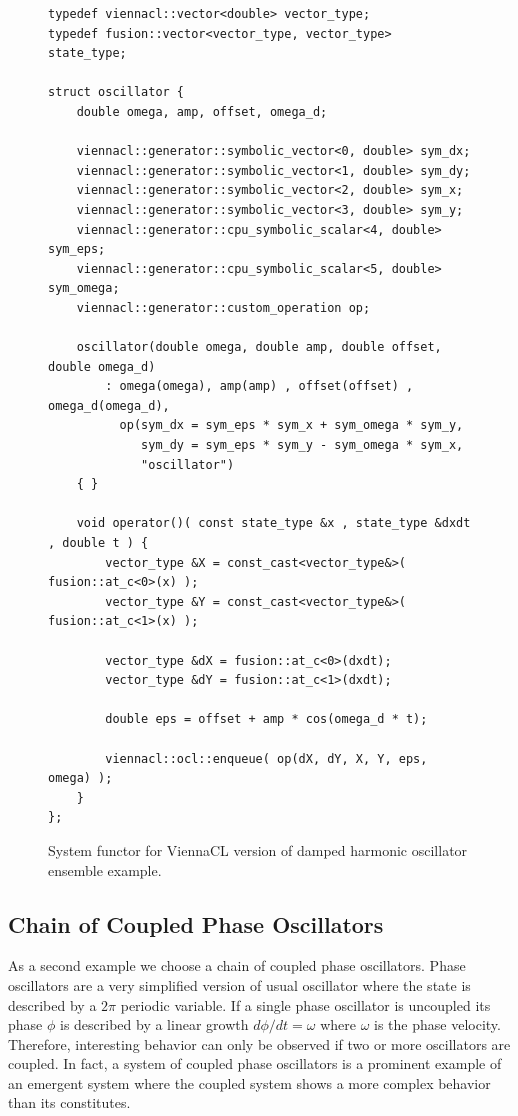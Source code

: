 \documentclass[1p]{elsarticle}
\begin{document}
\begin{figure}[p]
\begin{lstlisting}
typedef viennacl::vector<double> vector_type;
typedef fusion::vector<vector_type, vector_type> state_type;

struct oscillator {
    double omega, amp, offset, omega_d;

    viennacl::generator::symbolic_vector<0, double> sym_dx;
    viennacl::generator::symbolic_vector<1, double> sym_dy;
    viennacl::generator::symbolic_vector<2, double> sym_x;
    viennacl::generator::symbolic_vector<3, double> sym_y;
    viennacl::generator::cpu_symbolic_scalar<4, double> sym_eps;
    viennacl::generator::cpu_symbolic_scalar<5, double> sym_omega;
    viennacl::generator::custom_operation op;

    oscillator(double omega, double amp, double offset, double omega_d)
        : omega(omega), amp(amp) , offset(offset) , omega_d(omega_d),
          op(sym_dx = sym_eps * sym_x + sym_omega * sym_y,
             sym_dy = sym_eps * sym_y - sym_omega * sym_x,
             "oscillator")
    { }

    void operator()( const state_type &x , state_type &dxdt , double t ) {
        vector_type &X = const_cast<vector_type&>( fusion::at_c<0>(x) );
        vector_type &Y = const_cast<vector_type&>( fusion::at_c<1>(x) );

        vector_type &dX = fusion::at_c<0>(dxdt);
        vector_type &dY = fusion::at_c<1>(dxdt);

        double eps = offset + amp * cos(omega_d * t);

        viennacl::ocl::enqueue( op(dX, dY, X, Y, eps, omega) );
    }
};
\end{lstlisting}
\caption{System functor for ViennaCL version of damped harmonic oscillator
ensemble example.}
\label{code:viennacl:damped}
\end{figure}

\subsection{Chain of Coupled Phase Oscillators}

As a second example we choose a chain of coupled phase oscillators. Phase
oscillators are a very simplified version of usual oscillator where the state
is described by a $2\pi$ periodic variable. If a single phase oscillator is
uncoupled its phase $\phi$ is described by a linear growth $d\phi/dt = \omega$
where $\omega$ is the phase velocity. Therefore, interesting behavior can only
be observed if two or more oscillators are coupled. In fact, a system of
coupled phase oscillators is a prominent example of an emergent system where
the coupled system shows a more complex behavior than its constitutes.
\end{document}
